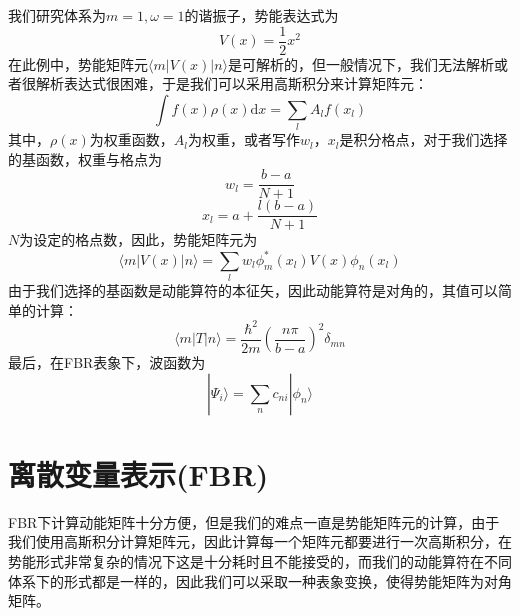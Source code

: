 \documentclass[]{article}
\begin{document}
我们研究体系为$m=1, \omega=1$的谐振子，势能表达式为
\begin{equation}
	V(x)=\dfrac{1}{2}x^2
\end{equation}
在此例中，势能矩阵元$\langle m|V(x)|n\rangle$是可解析的，但一般情况下，我们无法解析或者很解析表达式很困难，于是我们可以采用高斯积分来计算矩阵元：
\begin{equation}
	\int f(x)\rho(x)\mathrm{d}x=\sum\limits_lA_lf(x_l)
\end{equation}
其中，$\rho(x)$为权重函数，$A_l$为权重，或者写作$w_l$，$x_l$是积分格点，对于我们选择的基函数，权重与格点为
\begin{equation}
	w_l=\dfrac{b-a}{N+1}
\end{equation}
\begin{equation}
	x_l=a+\dfrac{l(b-a)}{N+1}
\end{equation}
$N$为设定的格点数，因此，势能矩阵元为
\begin{equation}
	\langle m|V(x)|n\rangle=\sum\limits_lw_l\phi_m^*(x_l)V(x)\phi_n(x_l)
\end{equation}
由于我们选择的基函数是动能算符的本征矢，因此动能算符是对角的，其值可以简单的计算：
\begin{equation}
	\langle m|T|n\rangle=\dfrac{\hbar^2}{2m}\left( \dfrac{n\pi}{b-a}\right)^2\delta_{mn} 
\end{equation}
最后，在FBR表象下，波函数为
\begin{equation}
	|\Psi_i\rangle=\sum\limits_nc_{ni}|\phi_n\rangle
\end{equation}
\section{离散变量表示(FBR)}
FBR下计算动能矩阵十分方便，但是我们的难点一直是势能矩阵元的计算，由于我们使用高斯积分计算矩阵元，因此计算每一个矩阵元都要进行一次高斯积分，在势能形式非常复杂的情况下这是十分耗时且不能接受的，而我们的动能算符在不同体系下的形式都是一样的，因此我们可以采取一种表象变换，使得势能矩阵为对角矩阵。
\end{document}
